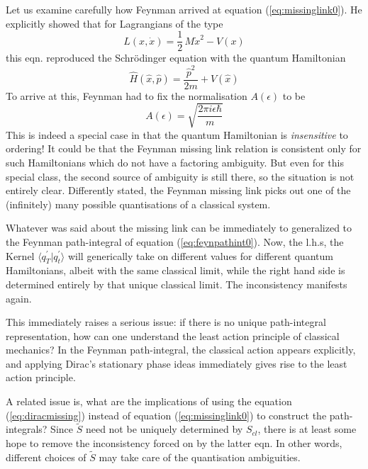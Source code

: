 \documentclass[12pt]{article}
\newcommand{\be}{\begin{equation}}
\newcommand{\ee}{\end{equation}}
\begin{document}
Let us
examine carefully how Feynman arrived at equation (\ref{eq:missinglink0}).
He explicitly showed that for Lagrangians of the type
\be
\label{eq:quadL}
L(x,{\dot x}) = \frac{1}{2}\,M{\dot x}^2 - V(x)
\ee
this eqn. reproduced the Schr\"odinger equation with the quantum Hamiltonian 
\be
\label{eq:quadH}
{\hat H({\hat x},{\hat p})} = \frac{{\hat p}^2}{2m} + V({\hat x})
\ee
To arrive at this, Feynman had to fix the normalisation $A(\epsilon)$ to be
\be
\label{eq:normfeyn}
A(\epsilon) = \sqrt{\frac{2\pi i \epsilon \hbar}{m}}
\ee
This is indeed a special case in that the quantum Hamiltonian is {\it insensitive} to ordering! It could be that the Feynman missing link
relation is consistent
only for such Hamiltonians which do not have a factoring ambiguity. But even for this special class, the second source of ambiguity is
still there, so the situation is not entirely clear. Differently stated, the Feynman missing link picks out one of the
(infinitely) many possible quantisations of a classical system. 

Whatever was said about the missing link can be immediately to generalized to the Feynman path-integral of equation (\ref{eq:feynpathint0}).
Now, the l.h.s, the Kernel $\langle q_T^\prime|q_t^\prime\rangle$ will generically take on different values for different quantum Hamiltonians,
albeit with the same classical limit, while the right hand side is determined entirely by that unique classical limit. The inconsistency manifests
again.

This immediately raises a serious issue: if there is no unique path-integral representation, how can one understand the least action principle
of classical mechanics? In the Feynman path-integral, the classical action appears explicitly, and applying Dirac's stationary phase ideas
immediately gives rise to the least action principle.

A related issue is, what are the implications of using the equation (\ref{eq:diracmissing}) instead of equation (\ref{eq:missinglink0}) to
construct the path-integrals? Since ${\tilde S}$ need not be uniquely determined by $S_{cl}$, there is at least some hope to remove
the inconsistency forced on by the latter eqn. In other words, different choices of ${\tilde S}$ may take care of the quantisation ambiguities.
\end{document}
